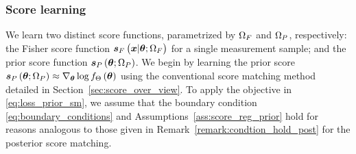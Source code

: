 \subsubsection{Score learning}\label{sec:score_learning_lik}
We  learn two distinct score functions, parametrized by $\Omega_{F}$ and $\Omega_{P}$, respectively: the Fisher score function $\bm{s}_{F}\left(\bm{x}|\bm{\theta}; \Omega_{F}\right)$ for a single measurement sample;  and the prior score function $\bm{s}_{P}\left(\bm{\theta};\Omega_{P}\right)$.
We begin by learning the prior score $\bm{s}_{P}\left(\bm{\theta} {;\Omega_{P}}\right)\approx\nabla_{\bm{\theta}}\log f_{\Theta}\left(\bm{\theta}\right)$ using the conventional score matching method detailed in Section~\ref{sec:score_over_view}. To apply the objective %
in \eqref{eq:loss_prior_sm}, 
we assume that 
the boundary condition %
\eqref{eq:boundary_conditions} 
and Assumptions~\ref{ass:score_reg_prior} hold  
for %
reasons analogous to {those given in Remark~\ref{remark:condtion_hold_post}} for the {posterior} score matching. %

